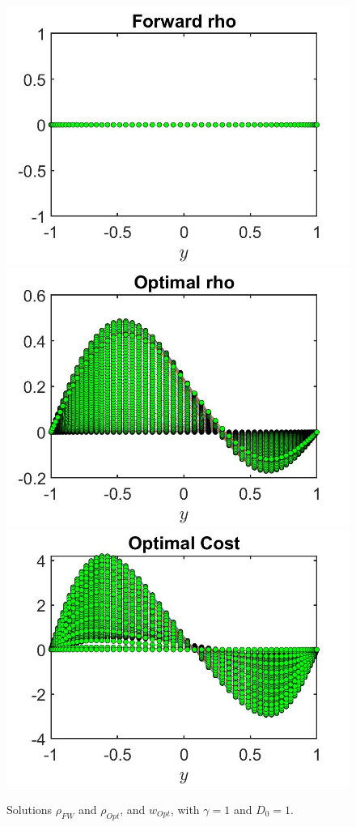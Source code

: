\documentclass[11pt, a4paper]{article}
\theoremstyle{definition}
\begin{document}
\begin{figure}[h]
	\includegraphics[scale=0.3]{DFrhoFW2.jpg}	
	\includegraphics[scale=0.3]{DFrhoOpt2.jpg}
	\includegraphics[scale=0.3]{DFwOpt2.jpg}
	\caption{Solutions $\rho_{FW}$ and $\rho_{Opt}$,  and $w_{Opt}$, with $\gamma = 1$ and $D_0 = 1$.}
	\label{rhoDF2}
\end{figure}
\end{document}
